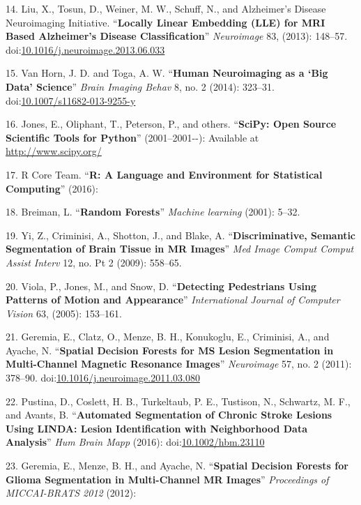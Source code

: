 \documentclass[11pt,]{article}
\begin{document}
\hypertarget{ref-Liu:2013aa}{}
14. Liu, X., Tosun, D., Weiner, M. W., Schuff, N., and Alzheimer's
Disease Neuroimaging Initiative. ``\textbf{Locally Linear Embedding
(LLE) for MRI Based Alzheimer's Disease Classification}''
\emph{Neuroimage} 83, (2013): 148--57.
doi:\href{https://doi.org/10.1016/j.neuroimage.2013.06.033}{10.1016/j.neuroimage.2013.06.033}

\hypertarget{ref-Van-Horn:2014aa}{}
15. Van Horn, J. D. and Toga, A. W. ``\textbf{Human Neuroimaging as a
`Big Data' Science}'' \emph{Brain Imaging Behav} 8, no. 2 (2014):
323--31.
doi:\href{https://doi.org/10.1007/s11682-013-9255-y}{10.1007/s11682-013-9255-y}

\hypertarget{ref-scipy}{}
16. Jones, E., Oliphant, T., Peterson, P., and others. ``\textbf{SciPy:
Open Source Scientific Tools for Python}'' (2001--2001-\/-): Available
at \url{http://www.scipy.org/}

\hypertarget{ref-R}{}
17. R Core Team. ``\textbf{R: A Language and Environment for Statistical
Computing}'' (2016):

\hypertarget{ref-breiman2001}{}
18. Breiman, L. ``\textbf{Random Forests}'' \emph{Machine learning}
(2001): 5--32.

\hypertarget{ref-yi2009}{}
19. Yi, Z., Criminisi, A., Shotton, J., and Blake, A.
``\textbf{Discriminative, Semantic Segmentation of Brain Tissue in MR
Images}'' \emph{Med Image Comput Comput Assist Interv} 12, no. Pt 2
(2009): 558--65.

\hypertarget{ref-viola2005}{}
20. Viola, P., Jones, M., and Snow, D. ``\textbf{Detecting Pedestrians
Using Patterns of Motion and Appearance}'' \emph{International Journal
of Computer Vision} 63, (2005): 153--161.

\hypertarget{ref-geremia2011}{}
21. Geremia, E., Clatz, O., Menze, B. H., Konukoglu, E., Criminisi, A.,
and Ayache, N. ``\textbf{Spatial Decision Forests for MS Lesion
Segmentation in Multi-Channel Magnetic Resonance Images}''
\emph{Neuroimage} 57, no. 2 (2011): 378--90.
doi:\href{https://doi.org/10.1016/j.neuroimage.2011.03.080}{10.1016/j.neuroimage.2011.03.080}

\hypertarget{ref-Pustina:2016aa}{}
22. Pustina, D., Coslett, H. B., Turkeltaub, P. E., Tustison, N.,
Schwartz, M. F., and Avants, B. ``\textbf{Automated Segmentation of
Chronic Stroke Lesions Using LINDA: Lesion Identification with
Neighborhood Data Analysis}'' \emph{Hum Brain Mapp} (2016):
doi:\href{https://doi.org/10.1002/hbm.23110}{10.1002/hbm.23110}

\hypertarget{ref-geremia2012}{}
23. Geremia, E., Menze, B. H., and Ayache, N. ``\textbf{Spatial Decision
Forests for Glioma Segmentation in Multi-Channel MR Images}''
\emph{Proceedings of MICCAI-BRATS 2012} (2012):
\end{document}
